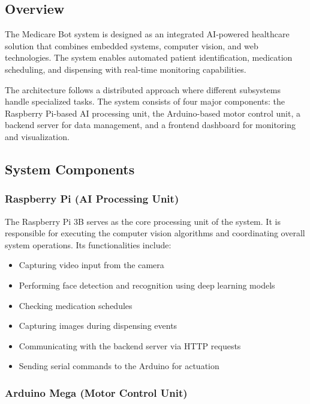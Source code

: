 

\subsection{Overview}

The Medicare Bot system is designed as an integrated AI-powered healthcare solution that combines embedded systems, computer vision, and web technologies. The system enables automated patient identification, medication scheduling, and dispensing with real-time monitoring capabilities.

The architecture follows a distributed approach where different subsystems handle specialized tasks. The system consists of four major components: the Raspberry Pi-based AI processing unit, the Arduino-based motor control unit, a backend server for data management, and a frontend dashboard for monitoring and visualization.

\subsection{System Components}

\subsubsection{Raspberry Pi (AI Processing Unit)}

The Raspberry Pi 3B serves as the core processing unit of the system. It is responsible for executing the computer vision algorithms and coordinating overall system operations. Its functionalities include:

\begin{itemize}
    \item Capturing video input from the camera
    \item Performing face detection and recognition using deep learning models
    \item Checking medication schedules
    \item Capturing images during dispensing events
    \item Communicating with the backend server via HTTP requests
    \item Sending serial commands to the Arduino for actuation
\end{itemize}

\subsubsection{Arduino Mega (Motor Control Unit)}

